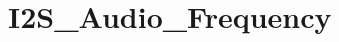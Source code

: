 \hypertarget{group___i2_s___audio___frequency}{\section{I2\-S\-\_\-\-Audio\-\_\-\-Frequency}
\label{group___i2_s___audio___frequency}
}
